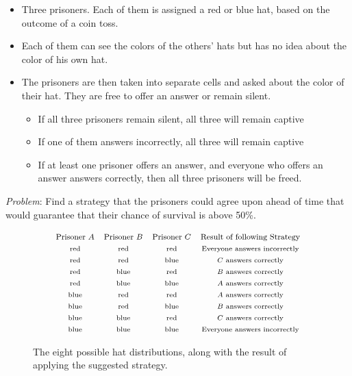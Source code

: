 \documentclass[12pt]{extarticle}
\begin{document}
\begin{itemize} 

\item Three prisoners. Each of them is assigned a red or blue hat, based on the outcome of a coin toss.
\item Each of them can see the colors of the others' hats but has no idea about the color of his own hat.
\item The prisoners are then taken into separate cells and asked about the color of their hat. They are free to offer an answer or remain silent. 

\begin{itemize}
\item If all three prisoners remain silent, all three will remain captive %
\item If one of them answers incorrectly, all three will remain captive %
\item If at least one prisoner offers an answer, and everyone who offers an answer answers correctly, then all three prisoners will be freed.
\end{itemize}
\end{itemize}

\noindent
\emph{Problem}: Find a strategy that the prisoners could agree upon ahead of time that would guarantee that their chance of survival is above 50\%.



\begin{figure}
\[
\begin{array}{cccc}
\text{\footnotesize Prisoner $A$} & \text{\footnotesize Prisoner $B$} & \text{\footnotesize Prisoner $C$} &\text{\footnotesize Result of following Strategy} \\
 \text{\scriptsize red} & \text{\scriptsize red} & \text{\scriptsize red} & \text{\scriptsize Everyone answers incorrectly} \\
  \text{\scriptsize red} & \text{\scriptsize red} & \text{\scriptsize blue} & \text{\scriptsize $C$ answers correctly} \\
   \text{\scriptsize red} & \text{\scriptsize blue} & \text{\scriptsize red} & \text{\scriptsize $B$ answers correctly} \\
    \text{\scriptsize red} & \text{\scriptsize blue} & \text{\scriptsize blue} & \text{\scriptsize $A$ answers correctly} \\
     \text{\scriptsize blue} & \text{\scriptsize red} & \text{\scriptsize red} & \text{\scriptsize $A$ answers correctly} \\
      \text{\scriptsize blue} & \text{\scriptsize red} & \text{\scriptsize blue} & \text{\scriptsize $B$ answers correctly} \\
       \text{\scriptsize blue} & \text{\scriptsize blue} & \text{\scriptsize red} & \text{\scriptsize $C$ answers correctly} \\
        \text{\scriptsize blue} & \text{\scriptsize blue} & \text{\scriptsize blue} & \text{\scriptsize Everyone answers incorrectly} \\
\end{array}
\]
\caption{The eight possible hat distributions, along with the result of applying the suggested strategy.}
\label{fig:prisoners}
\end{figure}
\end{document}
